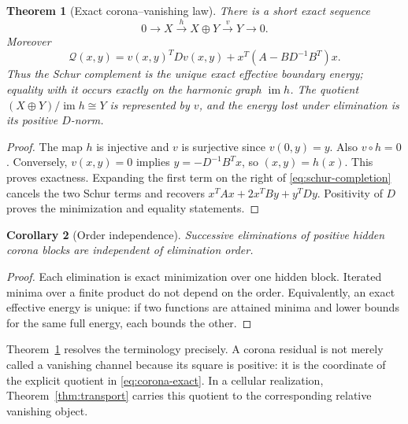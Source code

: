 \documentclass[11pt,a4paper]{amsart}
\theoremstyle{plain}
\newtheorem{theorem}{Theorem}[section]
\newtheorem{corollary}[theorem]{Corollary}
\theoremstyle{definition}
\newcommand{\im}{\operatorname{im}}
\begin{document}
\begin{theorem}[Exact corona--vanishing law]\label{thm:corona}
There is a short exact sequence
\begin{equation}\label{eq:corona-exact}
              0\longrightarrow X\xrightarrow{h}X\oplus Y
              \xrightarrow{v}Y\longrightarrow0.             \tag{V}
\end{equation}
Moreover
\begin{equation}\label{eq:schur-completion}
 \boxed{
 \mathcal Q(x,y)=v(x,y)^TDv(x,y)+
 x^T(A-BD^{-1}B^T)x.}                                      \tag{S}
\end{equation}
Thus the Schur complement is the unique exact effective boundary energy; equality with it occurs
exactly on the harmonic graph $\im h$.  The quotient
$(X\oplus Y)/\im h\cong Y$ is represented by $v$, and the energy lost under elimination is its
positive $D$-norm.
\end{theorem}

\begin{proof}
The map $h$ is injective and $v$ is surjective since $v(0,y)=y$.  Also $v\circ h=0$.  Conversely,
$v(x,y)=0$ implies $y=-D^{-1}B^Tx$, so $(x,y)=h(x)$.  This proves exactness.
Expanding the first term on the right of \eqref{eq:schur-completion} cancels the two Schur terms and
recovers $x^TAx+2x^TBy+y^TDy$.  Positivity of $D$ proves the minimization and equality statements.
\end{proof}

\begin{corollary}[Order independence]\label{cor:corona-order}
Successive eliminations of positive hidden corona blocks are independent of elimination order.
\end{corollary}

\begin{proof}
Each elimination is exact minimization over one hidden block.  Iterated minima over a finite
product do not depend on the order.  Equivalently, an exact effective energy is unique: if two
functions are attained minima and lower bounds for the same full energy, each bounds the other.
\end{proof}

Theorem~\ref{thm:corona} resolves the terminology precisely.  A corona residual is not merely
called a vanishing channel because its square is positive: it is the coordinate of the explicit
quotient in \eqref{eq:corona-exact}.  In a cellular realization, Theorem~\ref{thm:transport}
carries this quotient to the corresponding relative vanishing object.
\end{document}
